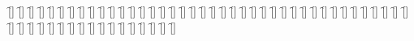 \begin{questions}
\begin{multicols}{2}
        \question  \f[]
        \question  \f[]
        \question  \f[]
        \question  \f[]
        \question  \f[]
        \question  \f[]
        \question  \f[]
        \question  \f[]
        \question  \f[]
        \question  \f[]
        \question  \f[]
        \question  \f[]
        \question  \f[]
        \question  \f[]
        \question  \f[]
        \question  \f[]
        \question  \f[]
        \question  \f[]
        \question  \f[]
        \question  \f[]
        \question  \f[]
        \question  \f[]
        \question  \f[]
        \question  \f[]
        \question  \f[]
        \question  \f[]
        \question  \f[]
        \question  \f[]
        \question  \f[]
        \question  \f[]
        \question  \f[]
        \question  \f[]
        \question  \f[]
        \question  \f[]
        \question  \f[]
        \question  \f[]
        \question  \f[]
        \question  \f[]
        \question  \f[]
        \question  \f[]
        \question  \f[]
        \question  \f[]
        \question  \f[]
        \question  \f[]
        \question  \f[]
        \question  \f[]
        \question  \f[]
        \question  \f[]
        \question  \f[]
        \question  \f[]
        \question  \f[]
        \question  \f[]
        \question  \f[]
        \question  \f[]
        \question  \f[]
        \question  \f[]
        \question  \f[]
    \end{multicols}
\end{questions}
